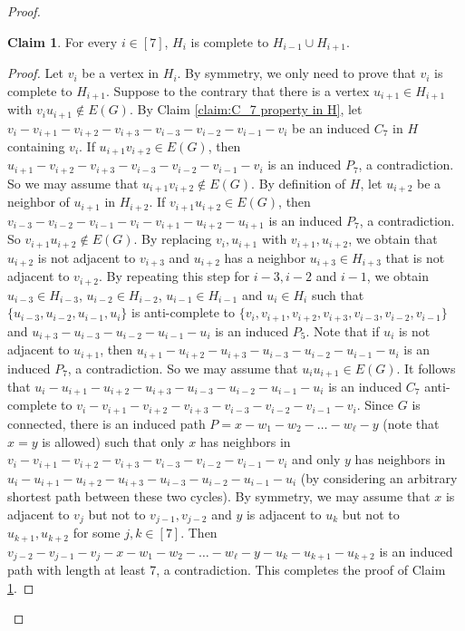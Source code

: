 \documentclass[11pt,a4paper]{article}
\theoremstyle{definition}
\newtheorem{claim}{\indent Claim}
\begin{document}
\begin{proof}
    \begin{claim}\label{claim:complete property in H}
        For every $i\in [7]$, $H_i$ is complete to $H_{i-1}\cup H_{i+1}$.
    \end{claim}
    \begin{proof}
        Let $v_i$ be a vertex in $H_i$. 
        By symmetry, we only need to prove that $v_i$ is complete to $H_{i+1}$. 
        Suppose to the contrary that there is a vertex $u_{i+1}\in H_{i+1}$ with $v_iu_{i+1}\notin E(G)$. 
        By Claim \ref{claim:C_7 property in H}, let $v_i-v_{i+1}-v_{i+2}-v_{i+3}-v_{i-3}-v_{i-2}-v_{i-1}-v_i$ be an induced $C_7$ in $H$ containing $v_i$. 
        If $u_{i+1}v_{i+2}\in E(G)$, then $u_{i+1}-v_{i+2}-v_{i+3}-v_{i-3}-v_{i-2}-v_{i-1}-v_i$ is an induced $P_7$, a contradiction. 
        So we may assume that $u_{i+1}v_{i+2}\notin E(G)$. 
        By definition of $H$, let $u_{i+2}$ be a neighbor of $u_{i+1}$ in $H_{i+2}$. 
        If $v_{i+1}u_{i+2}\in E(G)$, then $v_{i-3}-v_{i-2}-v_{i-1}-v_i-v_{i+1}-u_{i+2}-u_{i+1}$ is an induced $P_7$, a contradiction. 
        So $v_{i+1}u_{i+2}\notin E(G)$. 
        By replacing $v_i, u_{i+1}$ with $v_{i+1}, u_{i+2}$, we obtain that $u_{i+2}$ is not adjacent to $v_{i+3}$ and $u_{i+2}$ has a neighbor $u_{i+3}\in H_{i+3}$ that is not adjacent to $v_{i+2}$. 
        By repeating this step for $i-3,i-2$ and $i-1$, we obtain $u_{i-3}\in H_{i-3}$, $u_{i-2}\in H_{i-2}$, $u_{i-1}\in H_{i-1}$ and $u_i\in H_i$ such that $\{u_{i-3},u_{i-2},u_{i-1},u_i\}$ is anti-complete to $\{v_i,v_{i+1},v_{i+2},v_{i+3},v_{i-3},v_{i-2},v_{i-1}\}$ and $u_{i+3}-u_{i-3}-u_{i-2}-u_{i-1}-u_i$ is an induced $P_5$. 
        Note that if $u_i$ is not adjacent to $u_{i+1}$, then $u_{i+1}-u_{i+2}-u_{i+3}-u_{i-3}-u_{i-2}-u_{i-1}-u_i$ is an induced $P_7$, a contradiction. 
        So we may assume that $u_iu_{i+1}\in E(G)$. 
        It follows that $u_i-u_{i+1}-u_{i+2}-u_{i+3}-u_{i-3}-u_{i-2}-u_{i-1}-u_i$ is an induced $C_7$ anti-complete to $v_i-v_{i+1}-v_{i+2}-v_{i+3}-v_{i-3}-v_{i-2}-v_{i-1}-v_i$. 
        Since $G$ is connected, there is an induced path $P=x-w_1-w_2-\ldots
        -w_\ell-y$ (note that $x=y$ is allowed) such that only $x$ has neighbors in $v_i-v_{i+1}-v_{i+2}-v_{i+3}-v_{i-3}-v_{i-2}-v_{i-1}-v_i$ and only $y$ has neighbors in $u_i-u_{i+1}-u_{i+2}-u_{i+3}-u_{i-3}-u_{i-2}-u_{i-1}-u_i$ (by considering an arbitrary shortest path between these two cycles). 
        By symmetry, we may assume that $x$ is adjacent to $v_j$ but not to $v_{j-1},v_{j-2}$ and $y$ is adjacent to $u_k$ but not to $u_{k+1}, u_{k+2}$ for some $j,k\in [7]$. 
        Then $v_{j-2}-v_{j-1}-v_j-x-w_1-w_2-\ldots-w_\ell-y-u_k-u_{k+1}-u_{k+2}$ is an induced path with length at least 7, a contradiction. 
        This completes the proof of Claim \ref{claim:complete property in H}. 
    \end{proof}


\end{proof}
\end{document}
